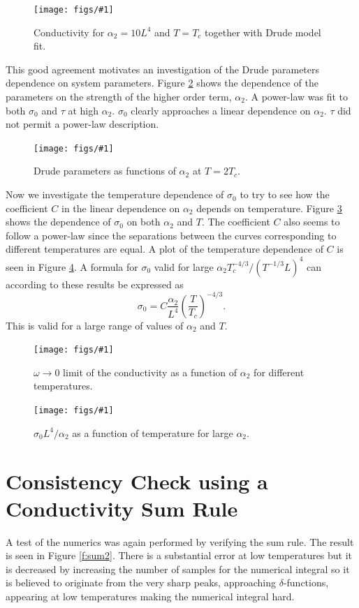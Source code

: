 \documentclass[12pt]{report}
\newcommand{\fig}[2]{
\begin{figure}
\centering
\texttt{[image: figs/\#1]}
\caption{#2}
\end{figure}
}
\begin{document}
\fig{drude_T_1Tc_a2_10}{Conductivity for $\alpha_2=10L^4$ and $T=T_c$ together with Drude model fit.\label{f:drude2}}

This good agreement motivates an investigation of the Drude parameters dependence on system parameters. Figure \ref{f:drudeVar} shows the dependence of the parameters on the strength of the higher order term, $\alpha_2$. A power-law was fit to both $\sigma_0$ and $\tau$ at high $\alpha_2$. $\sigma_0$ clearly approaches a linear dependence on $\alpha_2$. $\tau$ did not permit a power-law description.\\
\fig{drudeVara2_T=2Tc}{Drude parameters as functions of $\alpha_2$ at $T=2T_c$.\label{f:drudeVar}}

Now we investigate the temperature dependence of $\sigma_0$ to try to see how the coefficient $C$ in the linear dependence on $\alpha_2$ depends on temperature. Figure \ref{f:drudeVarT} shows the dependence of $\sigma_0$ on both $\alpha_2$ and $T$. The coefficient $C$ also seems to follow a power-law since the separations between the curves corresponding to different temperatures are equal. A plot of the temperature dependence of $C$ is seen in Figure \ref{f:Cdep}. A formula for $\sigma_0$ valid for large $\alpha_2T_c^{-4/3}/(T^{-1/3}L)^4$ can according to these results be expressed as
\begin{equation}
 \sigma_0=C\frac{\alpha_2}{L^4}\left(\frac{T}{T_c}\right)^{-4/3}.
\end{equation}
This is valid for a large range of values of $\alpha_2$ and $T$.

\fig{drudeVarMT}{$\omega\rightarrow0$ limit of the conductivity as a function of $\alpha_2$ for different temperatures.\label{f:drudeVarT}}

\fig{drudeTdep_1e4}{$\sigma_0L^4/\alpha_2$ as a function of temperature for large $\alpha_2$.\label{f:Cdep}}

\section{Consistency Check using a Conductivity Sum Rule}
A test of the numerics was again performed by verifying the sum rule. The result is seen in Figure \ref{f:sum2}.  There is a substantial error at low temperatures but it is decreased by increasing the number of samples for the numerical integral so it is believed to originate from the very sharp peaks, approaching $\delta$-functions, appearing at low temperatures making the numerical integral hard.
\end{document}
